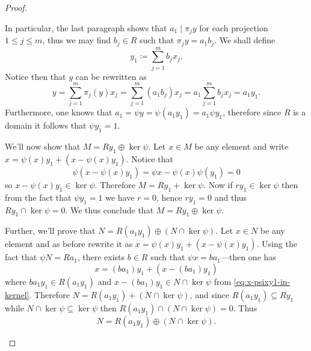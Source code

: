 \begin{proof}
\begin{enumerate}[(a)]
              In particular, the last paragraph shows that \(a_1 \mid \pi_j y\) for each
              projection \(1 \leq j \leq m\), thus we may find \(b_j \in R\) such that
              \(\pi_j y = a_1 b_j\). We shall define
              \[
                  y_1 \coloneq \sum_{j=1}^m b_j x_j.
              \]
              Notice then that \(y\) can be rewritten as
              \begin{equation}\label{eq:y=a1y1-rewrite}
                  y = \sum_{j=1}^m \pi_j(y) x_j
                  = \sum_{j=1}^m (a_1 b_j) x_j
                  = a_1 \sum_{j=1}^m b_j x_j
                  = a_1 y_1.
              \end{equation}
              Furthermore, one knows that \(a_1 = \psi y = \psi (a_1 y_1) = a_1 \psi y_1\),
              therefore since \(R\) is a domain it follows that \(\psi y_1 = 1\).

              We'll now show that \(M = R y_1 \oplus \ker \psi\). Let \(x \in M\) be any
              element and write \(x = \psi(x) y_1 + (x - \psi(x) y_1)\). Notice that
              \begin{equation}\label{eq:x-psixy1-in-kernel}
                  \psi(x - \psi(x) y_1) = \psi x - \psi(x) \psi(y_1) = 0
              \end{equation}
              so \(x - \psi(x) y_1 \in \ker \psi\). Therefore \(M = R y_1 + \ker \psi\). Now
              if \(r y_1 \in \ker \psi\) then from the fact that \(\psi y_1 = 1\) we have
              \(r = 0\), hence \(r y_1 = 0\) and thus \(R y_1 \cap \ker \psi = 0\). We thus
              conclude that \(M = R y_1 \oplus \ker \psi\).

              Further, we'll prove that \(N = R (a_1 y_1) \oplus (N \cap \ker \psi)\). Let
              \(x \in N\) be any element and as before rewrite it as \(x = \psi(x) y_1 + (x
              - \psi(x) y_1)\). Using the fact that \(\psi N = R a_1\), there exists \(b \in
              R\) such that \(\psi x = b a_1\)---then one has
              \[
                  x = (b a_1) y_1 + (x - (b a_1) y_1)
              \]
              where \(b a_1 y_1 \in R (a_1 y_1)\) and \(x - (b a_1) y_1 \in N \cap \ker \psi\)
              from \cref{eq:x-psixy1-in-kernel}. Therefore \(N = R (a_1 y_1) + (N \cap \ker
              \psi)\), and since \(R(a_1 y_1) \subseteq R y_1\) while \(N \cap \ker \psi
              \subseteq \ker \psi\) then \(R(a_1 y_1) \cap (N \cap \ker \psi) = 0\). Thus
              \[
                  N = R(a_1 y_1) \oplus (N \cap \ker \psi).
              \]


\end{enumerate}
\end{proof}
